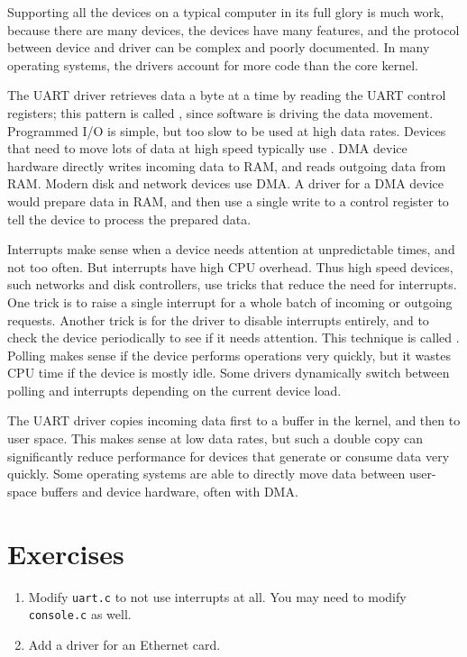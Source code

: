 Supporting all the devices on a typical computer in its full glory is
much work, because there are many devices, the devices have many
features, and the protocol between device and driver can be complex
and poorly documented. In many operating systems, the drivers account
for more code than the core kernel.

The UART driver retrieves data a byte at a time by reading the UART
control registers; this pattern is called , since
software is driving the data movement. Programmed I/O is simple, but
too slow to be used at high data rates. Devices that need to move lots
of data at high speed typically use .
DMA device hardware directly writes incoming data to RAM, and reads
outgoing data from RAM. Modern disk and network devices use DMA. A
driver for a DMA device would prepare data in RAM, and then use a
single write to a control register to tell the device to process the
prepared data.

Interrupts make sense when a device needs attention at unpredictable
times, and not too often. But interrupts have high CPU overhead. Thus
high speed devices, such networks and disk controllers, use tricks
that reduce the need for interrupts. One trick is to raise a single
interrupt for a whole batch of incoming or outgoing requests. Another
trick is for the driver to disable interrupts entirely, and to check
the device periodically to see if it needs attention. This technique
is called . Polling makes sense if the device performs
operations very quickly, but it wastes CPU time if the device is mostly
idle. Some drivers dynamically switch between polling and interrupts
depending on the current device load.

The UART driver copies incoming data first to a buffer in the kernel,
and then to user space. This makes sense at low data rates, but such a
double copy can significantly reduce performance for devices that
generate or consume data very quickly. Some operating systems are able
to directly move data between user-space buffers and device hardware,
often with DMA.

\section{Exercises}

\begin{enumerate}

\item Modify {\tt uart.c} to not use interrupts at all. You may need
to modify {\tt console.c} as well.

\item Add a driver for an Ethernet card.

\end{enumerate}
